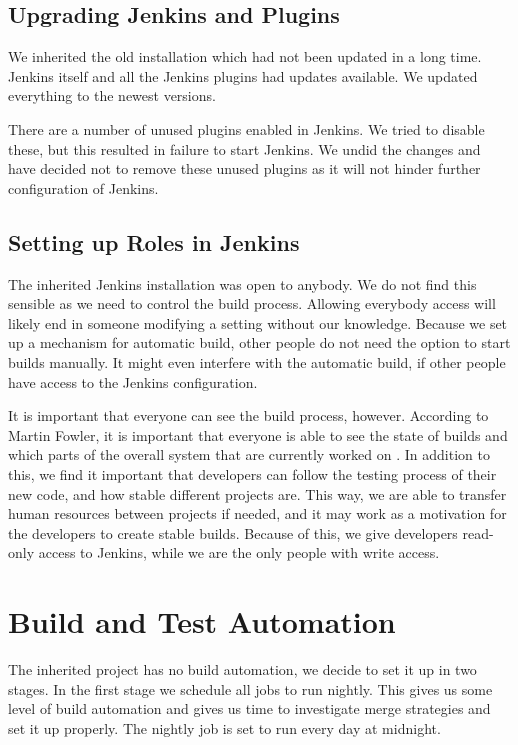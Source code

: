 \subsection{Upgrading Jenkins and Plugins}
We inherited the old installation which had not been updated in a long time. Jenkins itself and all the Jenkins plugins had updates available. We updated everything to the newest versions.

There are a number of unused plugins enabled in Jenkins. We tried to disable these, but this resulted in failure to start Jenkins. We undid the changes and have decided not to remove these unused plugins as it will not hinder further configuration of Jenkins. 

\subsection{Setting up Roles in Jenkins}
The inherited Jenkins installation was open to anybody. We do not find this sensible as we need to control the build process. Allowing everybody access will likely end in someone modifying a setting without our knowledge. Because we set up a mechanism for automatic build, other people do not need the option to start builds manually. It might even interfere with the automatic build, if other people have access to the Jenkins configuration.

It is important that everyone can see the build process, however. According to Martin Fowler, it is important that everyone is able to see the state of builds and which parts of the overall system that are currently worked on \parencite{fowlerCI}. In addition to this, we find it important that developers can follow the testing process of their new code, and how stable different projects are. This way, we are able to transfer human resources between projects if needed, and it may work as a motivation for the developers to create stable builds. Because of this, we give developers read-only access to Jenkins, while we are the only people with write access.

\section{Build and Test Automation}\label{sec:build_automation}
The inherited project has no build automation, we decide to set it up in two stages. In the first stage we schedule all jobs to run nightly. This gives us some level of build automation and gives us time to investigate merge strategies and set it up properly. The nightly job is set to run every day at midnight.

